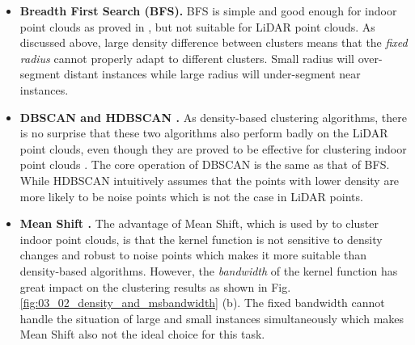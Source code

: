 \documentclass[final]{cvpr}
\begin{document}
\begin{itemize}[leftmargin=*]
    \item \textbf{Breadth First Search (BFS).}
        BFS is simple and good enough for indoor point clouds as proved in \cite{jiang2020pointgroup}, but not suitable
        for LiDAR point clouds.
        As discussed above, large density difference between clusters means that the \emph{fixed radius}
        cannot properly adapt to different clusters.
        Small radius will over-segment distant instances while large radius will under-segment near instances.
    \item \textbf{DBSCAN \cite{ester1996density} and HDBSCAN \cite{campello2013density}.}
        As density-based clustering algorithms, there is no surprise that these two algorithms also perform badly on the
        LiDAR point clouds, even though they are proved to be effective for clustering indoor point clouds
        \cite{engelmann20203d, zhang2020spatial}.
        The core operation of DBSCAN is the same as that of BFS.
        While HDBSCAN intuitively assumes that the points with lower density are more likely to be noise points which is
        not the case in LiDAR points.
    \item \textbf{Mean Shift \cite{comaniciu2002mean}.}
        The advantage of Mean Shift, which is used by \cite{lahoud20193d} to cluster indoor point clouds, is that the
        kernel function is not sensitive to density changes and robust to noise points which makes it more suitable than
        density-based algorithms.
        However, the \textit{bandwidth} of the kernel function has great impact on the clustering results as shown in Fig.
        \ref{fig:03_02_density_and_msbandwidth} (b).
        The fixed bandwidth cannot handle the situation of large and small instances simultaneously which makes Mean Shift
        also not the ideal choice for this task.
\end{itemize}
\end{document}
